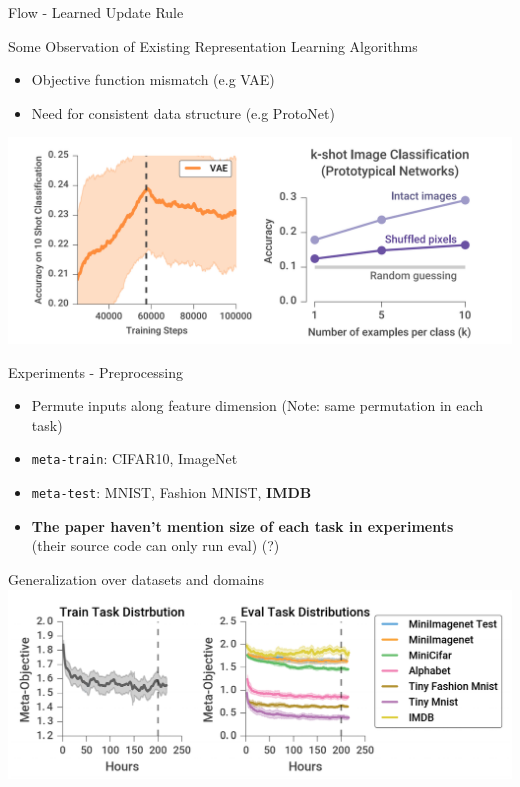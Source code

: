 \documentclass{beamer}
\begin{document}
\begin{frame}{Flow - Learned Update Rule}
\end{frame}

\begin{frame}{Some Observation of Existing Representation Learning Algorithms}
  \begin{itemize}
    \item Objective function mismatch (e.g VAE)
    \item Need for consistent data structure (e.g ProtoNet)
  \end{itemize}
  \center \includegraphics[width=\textwidth]{fig/obs.png}

\end{frame}

\begin{frame}{Experiments - Preprocessing}
  \begin{itemize}
    \item Permute inputs along feature dimension (Note: same permutation in each task)
    \item \texttt{meta-train}: CIFAR10, ImageNet
    \item \texttt{meta-test}: MNIST, Fashion MNIST, \textbf{IMDB}
  \item \textbf{The paper haven't mention size of each task in experiments} \\
    (their source code can only run eval) (?)
  \end{itemize}
\end{frame}

\begin{frame}{Generalization over datasets and domains}
  \center \includegraphics[width=\textwidth]{fig/lc.png}
\end{frame}
\end{document}

